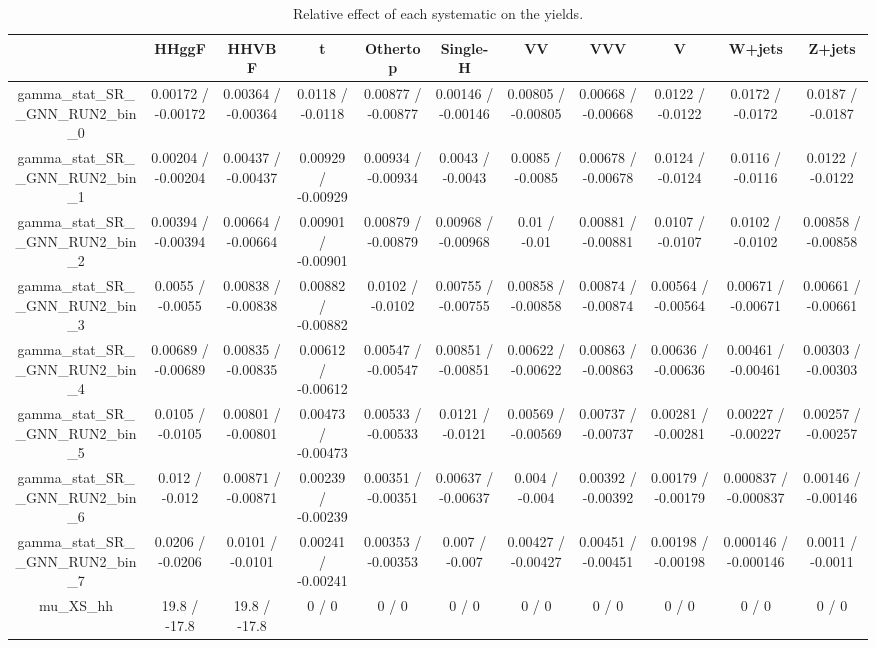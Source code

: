 \documentclass[10pt]{article}
\begin{document}
\begin{table}[htbp]
\begin{center}
\begin{tabular}{|c|c|c|c|c|c|c|c|c|c|c|}
\hline 
      & HHggF      & HHVBF      & t      & Othertop      & Single-H      & VV      & VVV      & V      & W+jets      & Z+jets \\ 
\hline 
  gamma_stat_SR__GNN_RUN2_bin_0 & 0.00172 / -0.00172 & 0.00364 / -0.00364 & 0.0118 / -0.0118 & 0.00877 / -0.00877 & 0.00146 / -0.00146 & 0.00805 / -0.00805 & 0.00668 / -0.00668 & 0.0122 / -0.0122 & 0.0172 / -0.0172 & 0.0187 / -0.0187 \\ 
  gamma_stat_SR__GNN_RUN2_bin_1 & 0.00204 / -0.00204 & 0.00437 / -0.00437 & 0.00929 / -0.00929 & 0.00934 / -0.00934 & 0.0043 / -0.0043 & 0.0085 / -0.0085 & 0.00678 / -0.00678 & 0.0124 / -0.0124 & 0.0116 / -0.0116 & 0.0122 / -0.0122 \\ 
  gamma_stat_SR__GNN_RUN2_bin_2 & 0.00394 / -0.00394 & 0.00664 / -0.00664 & 0.00901 / -0.00901 & 0.00879 / -0.00879 & 0.00968 / -0.00968 & 0.01 / -0.01 & 0.00881 / -0.00881 & 0.0107 / -0.0107 & 0.0102 / -0.0102 & 0.00858 / -0.00858 \\ 
  gamma_stat_SR__GNN_RUN2_bin_3 & 0.0055 / -0.0055 & 0.00838 / -0.00838 & 0.00882 / -0.00882 & 0.0102 / -0.0102 & 0.00755 / -0.00755 & 0.00858 / -0.00858 & 0.00874 / -0.00874 & 0.00564 / -0.00564 & 0.00671 / -0.00671 & 0.00661 / -0.00661 \\ 
  gamma_stat_SR__GNN_RUN2_bin_4 & 0.00689 / -0.00689 & 0.00835 / -0.00835 & 0.00612 / -0.00612 & 0.00547 / -0.00547 & 0.00851 / -0.00851 & 0.00622 / -0.00622 & 0.00863 / -0.00863 & 0.00636 / -0.00636 & 0.00461 / -0.00461 & 0.00303 / -0.00303 \\ 
  gamma_stat_SR__GNN_RUN2_bin_5 & 0.0105 / -0.0105 & 0.00801 / -0.00801 & 0.00473 / -0.00473 & 0.00533 / -0.00533 & 0.0121 / -0.0121 & 0.00569 / -0.00569 & 0.00737 / -0.00737 & 0.00281 / -0.00281 & 0.00227 / -0.00227 & 0.00257 / -0.00257 \\ 
  gamma_stat_SR__GNN_RUN2_bin_6 & 0.012 / -0.012 & 0.00871 / -0.00871 & 0.00239 / -0.00239 & 0.00351 / -0.00351 & 0.00637 / -0.00637 & 0.004 / -0.004 & 0.00392 / -0.00392 & 0.00179 / -0.00179 & 0.000837 / -0.000837 & 0.00146 / -0.00146 \\ 
  gamma_stat_SR__GNN_RUN2_bin_7 & 0.0206 / -0.0206 & 0.0101 / -0.0101 & 0.00241 / -0.00241 & 0.00353 / -0.00353 & 0.007 / -0.007 & 0.00427 / -0.00427 & 0.00451 / -0.00451 & 0.00198 / -0.00198 & 0.000146 / -0.000146 & 0.0011 / -0.0011 \\ 
  mu_XS_hh & 19.8 / -17.8 & 19.8 / -17.8 & 0 / 0 & 0 / 0 & 0 / 0 & 0 / 0 & 0 / 0 & 0 / 0 & 0 / 0 & 0 / 0 \\ 
\hline 
\end{tabular} 
\caption{Relative effect of each systematic on the yields.} 
\end{center} 
\end{table} 
\end{document}
